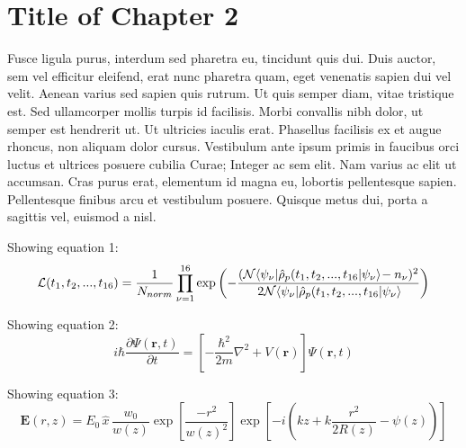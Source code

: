 
\chapter{Title of Chapter 2} %

\label{Chapter2} %




Fusce ligula purus, interdum sed pharetra eu, tincidunt quis dui. Duis auctor, sem vel efficitur eleifend, erat nunc pharetra quam, eget venenatis sapien dui vel velit. Aenean varius sed sapien quis rutrum. Ut quis semper diam, vitae tristique est. Sed ullamcorper mollis turpis id facilisis. Morbi convallis nibh dolor, ut semper est hendrerit ut. Ut ultricies iaculis erat. Phasellus facilisis ex et augue rhoncus, non aliquam dolor cursus. Vestibulum ante ipsum primis in faucibus orci luctus et ultrices posuere cubilia Curae; Integer ac sem elit. Nam varius ac elit ut accumsan. Cras purus erat, elementum id magna eu, lobortis pellentesque sapien. Pellentesque finibus arcu et vestibulum posuere. Quisque metus dui, porta a sagittis vel, euismod a nisl.
\newline

Showing equation 1:
\begin{equation}
  \label{eq1}
  \mathcal{L}(t_1, t_2, ..., t_{16}) = \frac{1}{N_{norm}} \prod_{\nu = 1}^{16}
  \exp \left(
    - \frac{ (\mathcal{N} \matrixel{\psi_{\nu}}{\hat\rho_p(t_1, t_2, ..., t_{16}}{\psi_{\nu}} - n_{\nu})^2 }
    { 2\mathcal{N}\matrixel {\psi_{\nu}} {\hat\rho_p(t_1, t_2, ..., t_{16}} {\psi_{\nu}} }
  \right)
\end{equation}

Showing equation 2:
\begin{equation}
  \label{eq:eq2}
  i \hbar
  \frac{\partial \Psi(\textbf{r},t)} {\partial t}
  =
  \left[
    -\frac{\hbar^2} {2m}
    \nabla^2 +
    V (\textbf{r})
  \right]
  \Psi(\textbf{r},t)
\end{equation}

Showing equation 3:
\begin{equation}
  \label{eq:GaussianBeam}
  { \mathbf E(r,z) } =
  E_0 \,
  \hat{x} \,
  \frac{w_0} {w(z)}
  \exp
  \left[
    \frac{-r^2}{w(z)^2}
  \right]
  \exp
  \left[
    -i  \!
    \left(
      kz +
      k \frac{r^2} {2R(z)} -
      \psi(z) \!
    \right)
  \right] 
\end{equation}

